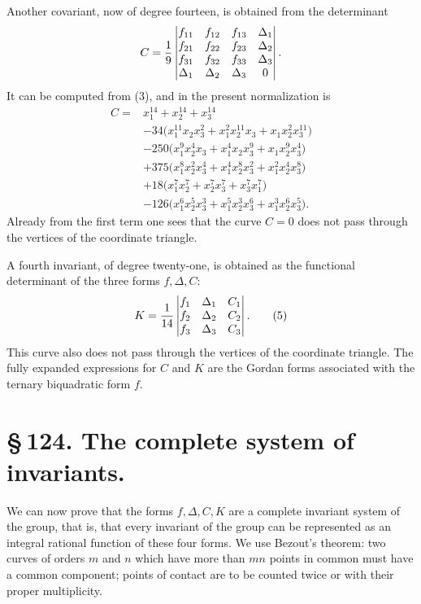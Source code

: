 \documentclass[11pt]{article}
\begin{document}
Another covariant, now of degree fourteen, is obtained from the determinant
\begin{equation}
C={1\over9}
\begin{vmatrix}
f_{11}&f_{12}&f_{13}&\Delta_1\\
f_{21}&f_{22}&f_{23}&\Delta_2\\
f_{31}&f_{32}&f_{33}&\Delta_3\\
\Delta_1&\Delta_2&\Delta_3&0
\end{vmatrix}.
\end{equation}
It can be computed from (3), and in the present normalization is
\begin{equation}
\begin{aligned}
C={}&x_1^{14}+x_2^{14}+x_3^{14}\\
&-34\bigl(x_1^{11}x_2x_3^2+x_1^2x_2^{11}x_3+x_1x_2^2x_3^{11}\bigr)\\
&-250\bigl(x_1^9x_2^4x_3+x_1^4x_2x_3^9+x_1x_2^9x_3^4\bigr)\\
&+375\bigl(x_1^8x_2^2x_3^4+x_1^4x_2^8x_3^2+x_1^2x_2^4x_3^8\bigr)\\
&+18\bigl(x_1^7x_2^7+x_2^7x_3^7+x_3^7x_1^7\bigr)\\
&-126\bigl(x_1^6x_2^5x_3^3+x_1^5x_2^3x_3^6+x_1^3x_2^6x_3^5\bigr).
\end{aligned}
\tag{4}
\end{equation}
Already from the first term one sees that the curve \(C=0\) does not pass through the vertices of the coordinate triangle.

A fourth invariant, of degree twenty-one, is obtained as the functional determinant of the three forms \(f,\Delta,C\):
\begin{equation}
K={1\over14}
\begin{vmatrix}
f_1&\Delta_1&C_1\\
f_2&\Delta_2&C_2\\
f_3&\Delta_3&C_3
\end{vmatrix}.
\tag{5}
\end{equation}
This curve also does not pass through the vertices of the coordinate triangle. The fully expanded expressions for \(C\) and \(K\) are the Gordan forms associated with the ternary biquadratic form \(f\).

\section*{\S\,124. The complete system of invariants.}

We can now prove that the forms \(f,\Delta,C,K\) are a complete invariant system of the group, that is, that every invariant of the group can be represented as an integral rational function of these four forms. We use Bezout's theorem: two curves of orders \(m\) and \(n\) which have more than \(mn\) points in common must have a common component; points of contact are to be counted twice or with their proper multiplicity.
\end{document}
